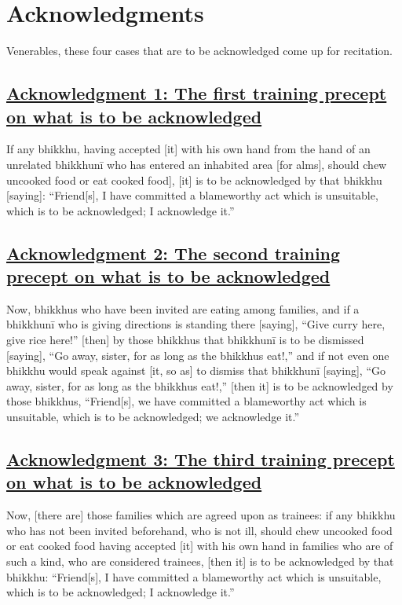 
\section{Acknowledgments}
\label{ack}

\begin{intro}
	Venerables, these four cases that are to be acknowledged come up for recitation.
\end{intro}

\setsubsecheadstyle{\subsubsectionFmtalt}
\subsection*{\hyperref[pd1]{Acknowledgment 1: The first training precept on what is to be acknowledged}}
\label{ack1}
If any bhikkhu, having accepted [it] with his own hand from the hand of an unrelated bhikkhunī who has entered an inhabited area [for alms], should chew uncooked food or eat cooked food], [it] is to be acknowledged by that bhikkhu [saying]: ``Friend[s], I have committed a blameworthy act which is unsuitable, which is to be acknowledged; I acknowledge it.''



\subsection*{\hyperref[pd2]{Acknowledgment 2: The second training precept on what is to be acknowledged}}
\label{ack2}
Now, bhikkhus who have been invited are eating among families, and if a bhikkhunī who is giving directions is standing there [saying], ``Give curry here, give rice here!'' [then] by those bhikkhus that bhikkhunī is to be dismissed [saying], ``Go away, sister, for as long as the bhikkhus eat!,'' and if not even one bhikkhu would speak against [it, so as] to dismiss that bhikkhunī [saying], ``Go away, sister, for as long as the bhikkhus eat!,'' [then it] is to be acknowledged by those bhikkhus, ``Friend[s], we have committed a blameworthy act which is unsuitable, which is to be acknowledged; we acknowledge it.''



\subsection*{\hyperref[pd3]{Acknowledgment 3: The third training precept on what is to be acknowledged}}
\label{ack3}
Now, [there are] those families which are agreed upon as trainees: if any bhikkhu who has not been invited beforehand, who is not ill, should chew uncooked food or eat cooked food having accepted [it] with his own hand in families who are of such a kind, who are considered trainees, [then it] is to be acknowledged by that bhikkhu: ``Friend[s], I have committed a blameworthy act which is unsuitable, which is to be acknowledged; I acknowledge it.''



